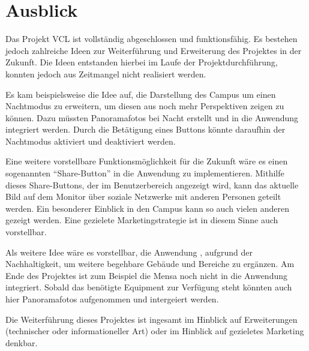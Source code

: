 \section{Ausblick}
\label{sec:Ausblick}

Das Projekt \ac{VCL} ist vollständig abgeschlossen und funktionsfähig.
Es bestehen jedoch zahlreiche Ideen zur Weiterführung und Erweiterung des 
Projektes in der Zukunft. Die Ideen entstanden hierbei im Laufe der Projektdurchführung, 
konnten jedoch aus Zeitmangel nicht realisiert werden.

Es kam beispielsweise die Idee auf, die Darstellung des Campus um einen Nachtmodus zu 
erweitern, um diesen aus noch mehr Perspektiven zeigen zu können.
Dazu müssten Panoramafotos bei Nacht erstellt und in die Anwendung integriert werden. 
Durch die Betätigung eines Buttons könnte daraufhin der Nachtmodus aktiviert und deaktiviert werden.

Eine weitere vorstellbare Funktionsmöglichkeit für die Zukunft wäre es einen 
sogenannten "`Share-Button"' in die Anwendung zu implementieren. Mithilfe dieses 
Share-Buttons, der im Benutzerbereich angezeigt wird, kann das aktuelle 
Bild auf dem Monitor über soziale Netzwerke mit anderen Personen geteilt werden.
Ein besonderer Einblick in den Campus kann so auch vielen anderen gezeigt werden.
Eine gezielete Marketingstrategie ist in diesem Sinne auch vorstellbar.

Als weitere Idee wäre es vorstellbar, die Anwendung , aufgrund der Nachhaltigkeit, um 
weitere begehbare Gebäude und Bereiche zu ergänzen. Am Ende des Projektes ist zum Beispiel
die Mensa noch nicht in die Anwendung integriert. Sobald das benötigte Equipment zur
Verfügung steht könnten auch hier Panoramafotos aufgenommen und intergeiert werden.

Die Weiterführung dieses Projektes ist ingesamt im Hinblick auf
Erweiterungen (technischer oder informationeller Art) oder im Hinblick
auf gezieletes Marketing denkbar.